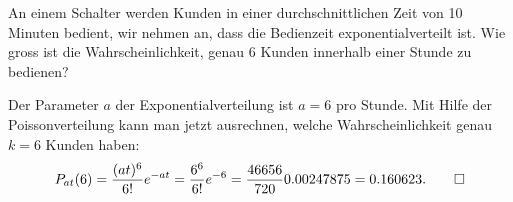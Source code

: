 An einem Schalter werden Kunden in einer durchschnittlichen
Zeit von 10 Minuten bedient, wir nehmen an, dass die Bedienzeit
exponentialverteilt ist. Wie gross ist die Wahrscheinlichkeit,
genau 6 Kunden innerhalb einer Stunde zu bedienen?


\begin{loesung}
Der Parameter $a$ der Exponentialverteilung ist $a=6$ pro Stunde.
Mit Hilfe der Poissonverteilung kann man jetzt ausrechnen,
welche Wahrscheinlichkeit genau $k=6$ Kunden haben:
\[
P_{at}(6)=\frac{(at)^6}{6!}e^{-at}=\frac{6^6}{6!}e^{-6}
=\frac{46656}{720}0.00247875
=0.160623.
\qedhere
\]
\end{loesung}
